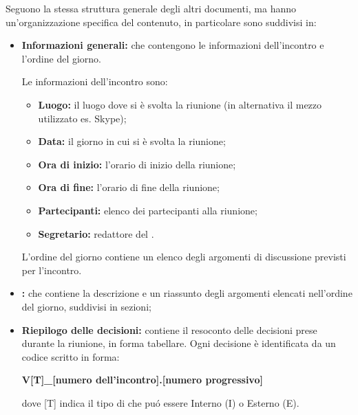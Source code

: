         Seguono la stessa struttura generale degli altri documenti, ma hanno un'organizzazione specifica del contenuto, in particolare sono suddivisi in:
        \begin{itemize}
          \item \textbf{Informazioni generali:} che contengono le informazioni dell'incontro e l'ordine del giorno.

             Le informazioni dell'incontro sono:
               \begin{itemize}
                 \item \textbf{Luogo:} il luogo dove si è svolta la riunione (in alternativa il mezzo utilizzato es. Skype);
                 \item \textbf{Data:} il giorno in cui si è svolta la riunione;
                 \item \textbf{Ora di inizio:} l'orario di inizio della riunione;
                 \item \textbf{Ora di fine:} l'orario di fine della riunione;
                 \item \textbf{Partecipanti:} elenco dei partecipanti alla riunione;
                 \item \textbf{Segretario:} redattore del \Verbale{}.
               \end{itemize}
			L'ordine del giorno contiene un elenco degli argomenti di discussione previsti per l'incontro.
          \item \textbf{\Verbale{}}\textbf{:} che contiene la descrizione e un riassunto degli argomenti elencati nell'ordine del giorno, suddivisi in sezioni;
          \item \textbf{Riepilogo delle decisioni:} contiene il resoconto delle decisioni prese durante la riunione, in forma tabellare. Ogni decisione è identificata da un codice scritto in forma:
          \begin{center}
            \textbf{V[T]\_[numero dell'incontro].[numero progressivo]}
          \end{center}
          dove [T] indica il tipo di \Verbale{} che puó essere Interno (I) o Esterno (E).
        \end{itemize}

